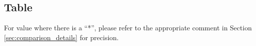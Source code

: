 ﻿\documentclass[../report.tex]{subfiles}
\begin{document}
% 
% 

\subsection{Table} \label{sec:comparison_table}
For value where there is a ``*'', please refer to the appropriate comment in Section \ref{sec:comparison_details} for precision.
\end{document}
